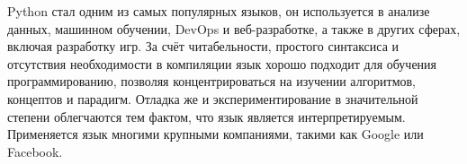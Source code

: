 Python стал одним из самых популярных языков, он используется в анализе данных, машинном обучении, DevOps и веб-разработке, а также в других сферах, включая разработку игр. За счёт читабельности, простого синтаксиса и отсутствия необходимости в компиляции язык хорошо подходит для обучения программированию, позволяя концентрироваться на изучении алгоритмов, концептов и парадигм. Отладка же и экспериментирование в значительной степени облегчаются тем фактом, что язык является интерпретируемым. Применяется язык многими крупными компаниями, такими как Google или Facebook.

